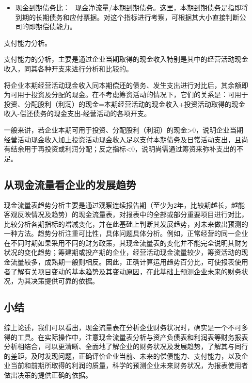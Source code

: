 \begin{enumerate.zh}
\begin{itemize}
            \item  现金到期债务比：=现金净流量/本期到期债务。这里，本期到期债务是指即将到期的长期债务和应付票据。对这个指标进行考察，可根据其大小直接判断公司的即期偿债能力。
        \end{itemize}

    \item  支付能力分析。

    支付能力的分析，主要是通过企业当期取得的现金收入特别是其中的经营活动现金收入，同其各种开支来进行分析和比较的。

    将企业本期经营活动现金收入同本期偿还的债务、发生支出进行对比后，其余额即为可用于投资及分配的现金。在不考虑筹资活动的情况下，它们的关系是：可用于投资、分配股利（利润）的现金=本期经营活动的现金收入+投资活动取得的现金收入-偿还债务的现金支出-经营活动的各项开支。

    一般来讲，若企业本期可用于投资、分配股利（利润）的现金>0，说明企业当期经营活动现金收入加上投资活动现金收入足以支付本期债务及日常活动支出，且尚有结余用于再投资或利润分配；反之指标<0，说明尚需通过筹资来弥补支出的不足。

    \end{enumerate.zh}

\subsection {从现金流量看企业的发展趋势}

    现金流量表趋势分析主要是通过观察连续报告期（至少为2年，比较期越长，越能客观反映情况及趋势）的现金流量表，对报表中的全部或部分重要项目进行对比，比较分析各期指标的增减变化，并在此基础上判断其发展趋势，对未来做出预测的一种方法。趋势分析注重可比性，具体问题具体分析。例如，正常经营的同一企业在不同时期如果采用不同的财务政策，其现金流量表的变化并不能完全说明其财务状况的变化趋势；筹建期或投产期的企业，经营活动现金流量较少，筹资活动的现金流量较多，成熟期一般则相反。因此，正确计算运用趋势百分比，可使报表使用者了解有关项目变动的基本趋势及其变动原因，在此基础上预测企业未来的财务状况，为其决策提供可靠的依据。

\subsection {小结}

    综上论述，我们可以看出，现金流量表在分析企业财务状况时，确实是一个不可多得的工具。在实际操作中，注意现金流量表分析与资产负债表和利润表等财务报表分析相结合，可以更清晰、全面地了解企业的财务状况及发展趋势，了解其与同行的差距，及时发现问题，正确评价企业当前、未来的偿债能力、支付能力，以及企业当前和前期所取得的利润的质量，科学的预测企业未来财务状况，为报表使用者做出决策的提供正确的依据。
